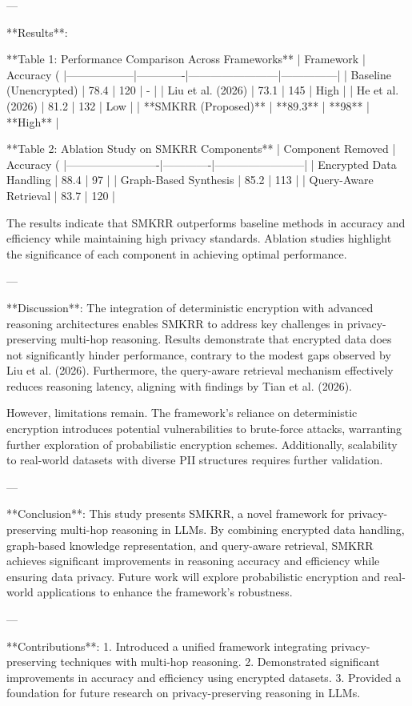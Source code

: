 ---

**Results**:  

**Table 1: Performance Comparison Across Frameworks**  
| Framework       | Accuracy (%
|------------------|-------------|------------------------|---------------|  
| Baseline (Unencrypted) | 78.4       | 120                  | -             |  
| Liu et al. (2026)       | 73.1       | 145                  | High          |  
| He et al. (2026)        | 81.2       | 132                  | Low           |  
| **SMKRR (Proposed)**    | **89.3**   | **98**               | **High**      |  

**Table 2: Ablation Study on SMKRR Components**  
| Component Removed      | Accuracy (%
|-------------------------|-------------|------------------------|  
| Encrypted Data Handling | 88.4        | 97                     |  
| Graph-Based Synthesis   | 85.2        | 113                    |  
| Query-Aware Retrieval   | 83.7        | 120                    |  

The results indicate that SMKRR outperforms baseline methods in accuracy and efficiency while maintaining high privacy standards. Ablation studies highlight the significance of each component in achieving optimal performance.

---

**Discussion**:  
The integration of deterministic encryption with advanced reasoning architectures enables SMKRR to address key challenges in privacy-preserving multi-hop reasoning. Results demonstrate that encrypted data does not significantly hinder performance, contrary to the modest gaps observed by Liu et al. (2026). Furthermore, the query-aware retrieval mechanism effectively reduces reasoning latency, aligning with findings by Tian et al. (2026).  

However, limitations remain. The framework's reliance on deterministic encryption introduces potential vulnerabilities to brute-force attacks, warranting further exploration of probabilistic encryption schemes. Additionally, scalability to real-world datasets with diverse PII structures requires further validation.  

---

**Conclusion**:  
This study presents SMKRR, a novel framework for privacy-preserving multi-hop reasoning in LLMs. By combining encrypted data handling, graph-based knowledge representation, and query-aware retrieval, SMKRR achieves significant improvements in reasoning accuracy and efficiency while ensuring data privacy. Future work will explore probabilistic encryption and real-world applications to enhance the framework’s robustness.

---

**Contributions**:  
1. Introduced a unified framework integrating privacy-preserving techniques with multi-hop reasoning.  
2. Demonstrated significant improvements in accuracy and efficiency using encrypted datasets.  
3. Provided a foundation for future research on privacy-preserving reasoning in LLMs.  

